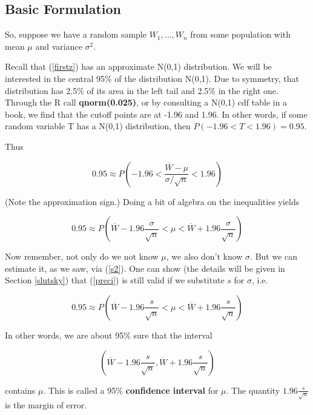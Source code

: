 \subsection{Basic Formulation}
\label{ourfirstci}

So, suppose we have a random sample $W_1,...,W_n$ from some population
with mean $\mu$ and variance $\sigma^2$.

Recall that (\ref{firstz}) has an approximate N(0,1) distribution.  We
will be interested in the central 95\% of the distribution N(0,1).  Due
to symmetry, that distribution has 2.5\% of its area in the left tail
and 2.5\% in the right one.  Through the R call {\bf qnorm(0.025)}, or
by consulting a N(0,1) cdf table in a book, we find that the cutoff
points are at -1.96 and 1.96.  In other words, if some random variable
T has a N(0,1) distribution, then $P(-1.96 < T < 1.96) = 0.95$.

Thus

\begin{equation}
\label{cistart}
0.95 \approx P \left (-1.96 <  \frac{\overline{W}-\mu}{\sigma/\sqrt{n}} < 1.96 
\right )
\end{equation}

(Note the approximation sign.) Doing a bit of algebra on the
inequalities yields

\begin{equation}
\label{preci}
0.95 \approx P \left ( \overline{W} - 1.96 \frac{\sigma}{\sqrt{n}} < \mu
< \overline{W} + 1.96 \frac{\sigma}{\sqrt{n}} \right )
\end{equation}

Now remember, not only do we not know $\mu$, we also don't know
$\sigma$.  But we can estimate it, as we saw, via (\ref{s2}).  One can
show (the details will be given in Section \ref{slutsky}) that
(\ref{preci}) is still valid if we substitute $s$ for $\sigma$, i.e.

\begin{equation}
\label{theci}
0.95 \approx P \left ( \overline{W} - 1.96 \frac{s}{\sqrt{n}} < \mu
< \overline{W} + 1.96 \frac{s}{\sqrt{n}} \right ) 
\end{equation}

In other words, we are about 95\% sure that the interval 

\begin{equation}
\label{meanci}
(\overline{W} - 1.96 \frac{s}{\sqrt{n}}, \overline{W} + 1.96 \frac{s}{\sqrt{n}})
\end{equation}

contains $\mu$.  This is called a 95\% {\bf confidence interval} for
$\mu$.  The quantity $1.96 \frac{s}{\sqrt{n}}$ is the margin of error.


